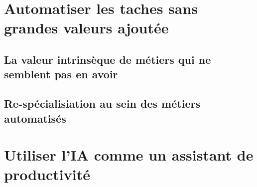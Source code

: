     \chapter{Automatiser les taches sans grandes valeurs ajoutée}
        
        \section{La valeur intrinsèque de métiers qui ne semblent pas en avoir }
        \section{Re-spécialisiation au sein des métiers automatisés}
        


    \chapter{Utiliser l'IA comme un assistant de productivité}
